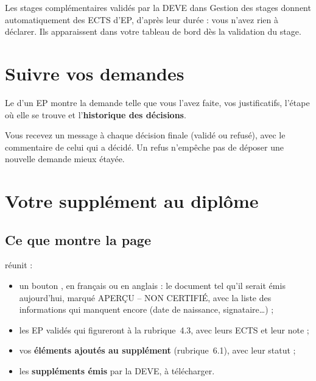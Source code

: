 \documentclass[11pt,a4paper]{article}
\begin{document}
Les stages complémentaires validés par la DEVE dans \og Gestion des stages\fg{} donnent
automatiquement des ECTS d'EP, d'après leur durée : vous n'avez rien à déclarer. Ils
apparaissent dans votre tableau de bord dès la validation du stage.

\section{Suivre vos demandes}

Le  d'un EP montre la demande telle que vous l'avez faite, vos justificatifs,
l'étape où elle se trouve et l'\textbf{historique des décisions}.


Vous recevez un message à chaque décision finale (validé ou refusé), avec le commentaire de
celui qui a décidé. Un refus n'empêche pas de déposer une nouvelle demande mieux étayée.

\section{Votre supplément au diplôme}\label{sec:etu-supplement}

\subsection{Ce que montre la page}

 réunit :
\begin{itemize}
  \item un bouton , en français ou en anglais : le document tel
    qu'il serait émis aujourd'hui, marqué \og APERÇU -- NON CERTIFIÉ\fg{}, avec la liste des
    informations qui manquent encore (date de naissance, signataire\dots) ;
  \item les EP validés qui figureront à la rubrique~4.3, avec leurs ECTS et leur note ;
  \item vos \textbf{éléments ajoutés au supplément} (rubrique~6.1), avec leur statut ;
  \item les \textbf{suppléments émis} par la DEVE, à télécharger.
\end{itemize}


\end{document}
